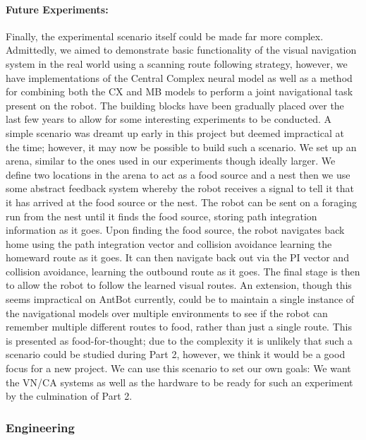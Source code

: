 \documentclass[a4paper,11pt,twoside,openright]{article}
\begin{document}
\paragraph{Future Experiments:}
Finally, the experimental scenario itself could be made far more complex. Admittedly, we aimed to demonstrate
basic functionality of the visual navigation system in the real world using a scanning route following strategy,
however, we have implementations of the Central Complex neural model as well as a method for combining
both the CX and MB models to perform a joint navigational task \cite{Zhang2017, Scimeca2017} present on the robot.
The building blocks have been gradually placed over the last few years to allow for some interesting experiments to
be conducted. A simple scenario was dreamt up early in this project but deemed impractical at the time; however,
it may now be possible to build such a scenario. We set up an arena, similar to the ones used in our experiments
though ideally larger. We define two locations in the arena to act as a food source and a nest then we use some
abstract feedback system whereby the robot receives a signal to tell it that it has arrived at the food source or
the nest. The robot can be sent on a foraging run from the nest until it finds the food source, storing path
integration information as it goes. Upon finding the food source, the robot navigates back home using
the path integration vector and collision avoidance learning the homeward route as it goes. It can then
navigate back out via the PI vector and collision avoidance, learning the outbound route as it goes. The final
stage is then to allow the robot to follow the learned visual routes. An extension, though this seems impractical
on AntBot currently, could be to maintain a single instance of the navigational models over multiple environments
to see if the robot can remember multiple different routes to food, rather than just a single route. This is presented
as food-for-thought; due to the complexity it is unlikely that such a scenario could be studied during Part 2, however,
we think it would be a good focus for a new project. We can use this scenario to set our own goals: We want the
VN/CA systems as well as the hardware to be ready for such an experiment by the culmination of Part 2.
 
\subsubsection{Engineering} \label{sec:engineering}
\end{document}
